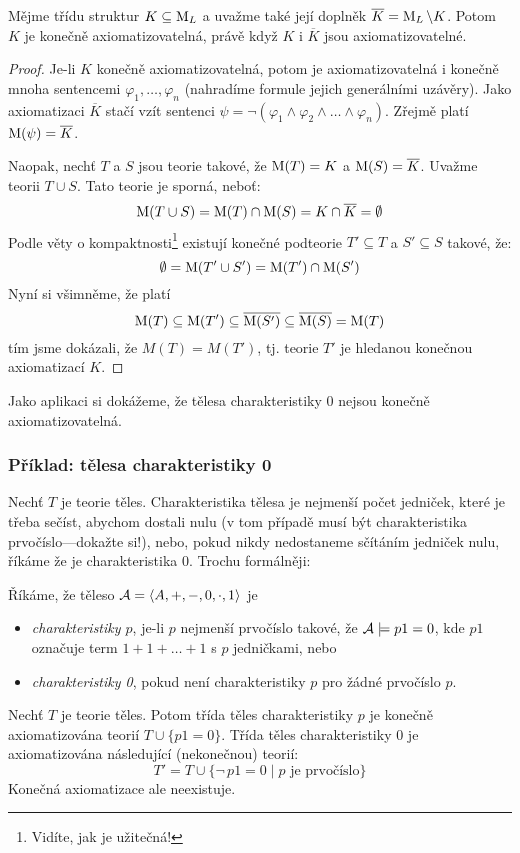 \begin{theorem}\label{theorem:finite-axiomatizability}
    Mějme třídu struktur $K\subseteq \operatorname{M}_L$ a uvažme také její doplněk $\overline{K}=\operatorname{M}_L\setminus K$. Potom $K$ je konečně axiomatizovatelná, právě když $K$ i $\overline{K}$ jsou axiomatizovatelné.   
\end{theorem}
\begin{proof}
Je-li $K$ konečně axiomatizovatelná, potom je axiomatizovatelná i konečně mnoha sentencemi $\varphi_1,\dots,\varphi_n$ (nahradíme formule jejich generálními uzávěry). Jako axiomatizaci $\overline{K}$ stačí vzít sentenci $\psi=\neg(\varphi_1\land\varphi_2\land\dots\land\varphi_n)$. Zřejmě platí $\operatorname{M}(\psi)=\overline{K}$.

Naopak, nechť $T$ a $S$ jsou teorie takové, že $\operatorname{M}(T)=K$ a $\operatorname{M}(S)=\overline{K}$. Uvažme teorii $T\cup S$. Tato teorie je sporná, neboť:
$$
\operatorname{M}(T\cup S)=\operatorname{M}(T)\cap \operatorname{M}(S)=K\cap\overline{K}=\emptyset
$$
Podle věty o kompaktnosti\footnote{Vidíte, jak je užitečná!} existují konečné podteorie $T'\subseteq T$ a $S'\subseteq S$ takové, že:
$$
\emptyset = \operatorname{M}(T'\cup S')=\operatorname{M}(T')\cap \operatorname{M}(S')
$$
Nyní si všimněme, že platí
$$
\operatorname{M}(T)\subseteq \operatorname{M}(T')\subseteq \overline{\operatorname{M}(S')}\subseteq \overline{\operatorname{M}(S)}=\operatorname{M}(T)
$$
tím jsme dokázali, že $M(T)=M(T')$, tj. teorie $T'$ je hledanou konečnou axiomatizací $K$.
\end{proof}

Jako aplikaci si dokážeme, že tělesa charakteristiky 0 nejsou konečně axiomatizovatelná.

\subsubsection*{Příklad: tělesa charakteristiky 0}
 
Nechť $T$ je teorie těles. Charakteristika tělesa je nejmenší počet jedniček, které je třeba sečíst, abychom dostali nulu (v tom případě musí být charakteristika prvočíslo---dokažte si!), nebo, pokud nikdy nedostaneme sčítáním jedniček nulu, říkáme že je charakteristika 0. Trochu formálněji:

\begin{definition}
Říkáme, že těleso $\mathcal{A}=\langle A,+,-,0,\cdot,1 \rangle$ je
\begin{itemize}
    \item \emph{charakteristiky $p$}, je-li $p$ nejmenší prvočíslo takové, že $\mathcal{A}\models p1=0$, kde $p1$ označuje term $1+1+\dots+1$ s $p$ jedničkami, nebo
    \item \emph{charakteristiky 0}, pokud není charakteristiky $p$ pro žádné prvočíslo $p$.
\end{itemize}
\end{definition}
Nechť $T$ je teorie těles. Potom třída těles charakteristiky $p$ je konečně axiomatizována teorií $T\cup \{p1=0\}$. Třída těles charakteristiky 0 je axiomatizována následující (nekonečnou) teorií:
$$
T'=T\cup \{\neg\, p1=0\mid p\text{ je prvočíslo}\}
$$
Konečná axiomatizace ale neexistuje.

